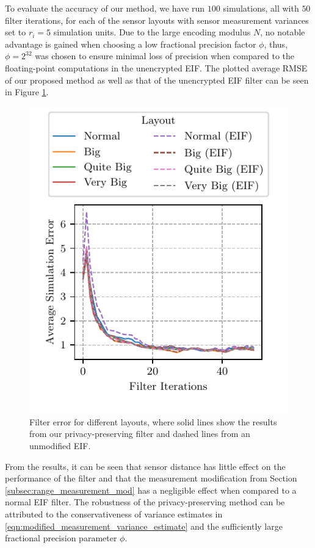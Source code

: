 \documentclass[10pt,letterpaper,oneside,twocolumn,journal]{IEEEtran}
\theoremstyle{definition}
\theoremstyle{definition}
\theoremstyle{remark}
\begin{document}
To evaluate the accuracy of our method, we have run $100$ simulations, all with $50$ filter iterations, for each of the sensor layouts with sensor measurement variances set to $r_i=5$ simulation units. Due to the large encoding modulus $N$, no notable advantage is gained when choosing a low fractional precision factor $\phi$, thus, $\phi=2^{32}$ was chosen to ensure minimal loss of precision when compared to the floating-point computations in the unencrypted EIF. The plotted average RMSE of our proposed method as well as that of the unencrypted EIF filter can be seen in Figure \ref{fig:sim_layout_errors}.
\begin{figure}[htbp]
\centering
\includegraphics{images/layout_errors.pdf}
\caption{Filter error for different layouts, where solid lines show the results from our privacy-preserving filter and dashed lines from an unmodified EIF.}
\label{fig:sim_layout_errors}
\end{figure}
From the results, it can be seen that sensor distance has little effect on the performance of the filter and that the measurement modification from Section \ref{subsec:range_measurement_mod} has a negligible effect when compared to a normal EIF filter. The robustness of the privacy-preserving method can be attributed to the conservativeness of variance estimates in \eqref{eqn:modified_measurement_variance_estimate} and the sufficiently large fractional precision parameter $\phi$.
\end{document}
